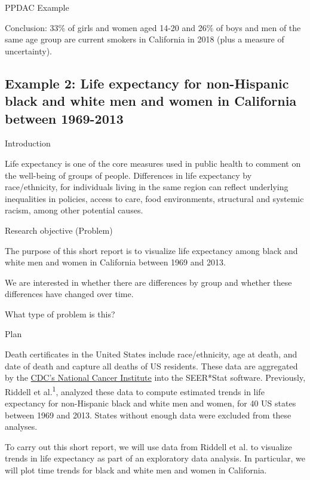 \documentclass[ignorenonframetext,aspectratio=169]{beamer}
\begin{document}
\begin{frame}{PPDAC Example}

Conclusion: 33\% of girls and women aged 14-20 and 26\% of boys and men
of the same age group are current smokers in California in 2018 (plus a
measure of uncertainty).

\end{frame}

\subsection{Example 2: Life expectancy for non-Hispanic black and white
men and women in California between
1969-2013}\label{example-2-life-expectancy-for-non-hispanic-black-and-white-men-and-women-in-california-between-1969-2013}

\begin{frame}{Introduction}

Life expectancy is one of the core measures used in public health to
comment on the well-being of groups of people. Differences in life
expectancy by race/ethnicity, for individuals living in the same region
can reflect underlying inequalities in policies, access to care, food
environments, structural and systemic racism, among other potential
causes.

\end{frame}

\begin{frame}{Research objective (Problem)}

The purpose of this short report is to visualize life expectancy among
black and white men and women in California between 1969 and 2013.

We are interested in whether there are differences by group and whether
these differences have changed over time.

What type of problem is this?

\end{frame}

\begin{frame}{Plan}

Death certificates in the United States include race/ethnicity, age at
death, and date of death and capture all deaths of US residents. These
data are aggregated by the
\href{https://seer.cancer.gov/seerstat/}{CDC's National Cancer
Institute} into the SEER*Stat software. Previously, Riddell et
al.\textsuperscript{1}, analyzed these data to compute estimated trends
in life expectancy for non-Hispanic black and white men and women, for
40 US states between 1969 and 2013. States without enough data were
excluded from these analyses.

To carry out this short report, we will use data from Riddell et al. to
visualize trends in life expectancy as part of an exploratory data
analysis. In particular, we will plot time trends for black and white
men and women in California.

\end{frame}
\end{document}
